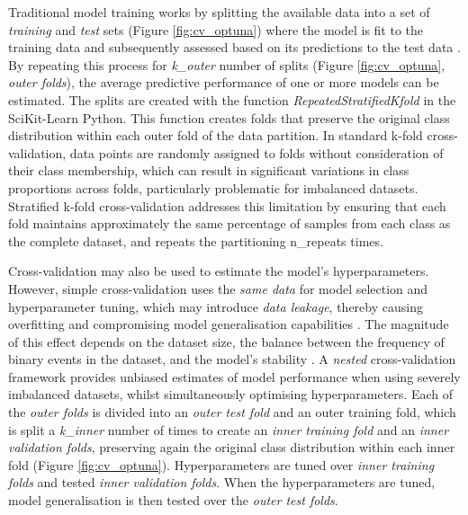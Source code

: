 \documentclass[nhess, manuscript]{copernicus}
\begin{document}
Traditional model training works by splitting the available data into a set of \textit{training} and \textit{test} sets (Figure \ref{fig:cv_optuna}) where the model is fit to the training data and subsequently assessed based on its predictions to the test data \citep{Hastie_2009}. By repeating this process for \textit{k\_outer} number of splits (Figure \ref{fig:cv_optuna}, \textit{outer folds}), the average predictive performance of one or more models can be estimated. The splits are created with the function \textit{RepeatedStratifiedKfold} in the SciKit-Learn Python. This function creates folds that preserve the original class distribution within each outer fold of the data partition. In standard k-fold cross-validation, data points are randomly assigned to folds without consideration of their class membership, which can result in significant variations in class proportions across folds, particularly problematic for imbalanced datasets. Stratified k-fold cross-validation addresses this limitation by ensuring that each fold maintains approximately the same percentage of samples from each class as the complete dataset, and repeats the partitioning n\_repeats times. 

Cross-validation may also be used to estimate the model's hyperparameters. However, simple cross-validation uses the \textit{same data} for model selection and hyperparameter tuning, which may introduce \textit{data leakage}, thereby causing overfitting and compromising model generalisation capabilities \citep{Sasse_2025}. The magnitude of this effect depends on the dataset size, the balance between the frequency of binary events in the dataset, and the model's stability \citep{Sasse_2025}. A \textit{nested} cross-validation framework provides unbiased estimates of model performance when using severely imbalanced datasets, whilst simultaneously optimising hyperparameters. Each of the \textit{outer folds} is divided into an \textit{outer test fold} and an outer training fold, which is split a \textit{k\_inner} number of times to create an \textit{inner training fold} and an \textit{inner validation folds}, preserving again the original class distribution within each inner fold (Figure \ref{fig:cv_optuna}). Hyperparameters are tuned over \textit{inner training folds} and tested \textit{inner validation folds}. When the hyperparameters are tuned, model generalisation is then tested over the \textit{outer test folds}.
\end{document}
